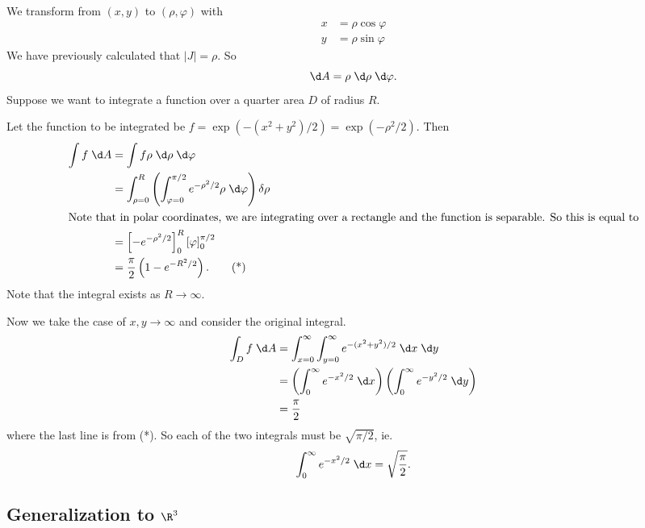 \documentclass[a4paper]{article}
\begin{document}
\begin{eg}
  We transform from $(x, y)$ to $(\rho, \varphi)$ with
  \begin{align*}
    x &= \rho\cos \varphi\\
    y &= \rho\sin \varphi
  \end{align*}
  We have previously calculated that $|J| = \rho$. So
  \[
    \d A = \rho \;\d \rho \;\d \varphi.
  \]
  Suppose we want to integrate a function over a quarter area $D$ of radius $R$.
  \begin{center}
  \end{center}
  Let the function to be integrated be $f = \exp(-(x^2 + y^2)/2) = \exp(-\rho^2/2)$. Then
  \begin{align*}
    \int f\;\d A &= \int f\rho\;\d\rho\;\d\varphi\\
    &=\int_{\rho=0}^R\left(\int_{\varphi=0}^{\pi/2}e^{-\rho^2/2}\rho \;\d \varphi\right)\delta \rho\\
    \intertext{Note that in polar coordinates, we are integrating over a rectangle and the function is separable. So this is equal to}
    &= \left[-e^{-\rho^2/2}\right]^R_0\left[\varphi\right]_0^{\pi/2}\\
    &= \frac{\pi}{2}\left( 1 - e^{-R^2/2}\right).\tag{*}
  \end{align*}
  Note that the integral exists as $R\to \infty$.

  Now we take the case of $x, y\to \infty$ and consider the original integral.
  \begin{align*}
    \int _D f\;\d A &= \int_{x = 0}^{\infty} \int_{y=0}^\infty e^{-(x^2 + y^2)/2}\;\d x\;\d y\\
    &= \left(\int_0^\infty e^{-x^2/2}\;\d x\right)\left(\int_0^\infty e^{-y^2/2}\;\d y\right)\\
    &= \frac{\pi}{2}
  \end{align*}
  where the last line is from (*). So each of the two integrals must be $\sqrt{\pi/2}$, ie.
  \[
    \int_0^\infty e^{-x^2/2}\;\d x = \sqrt{\frac{\pi}{2}}.
  \]

\end{eg}
\subsection{Generalization to \texorpdfstring{$\R^3$}{R3}}
\end{document}
